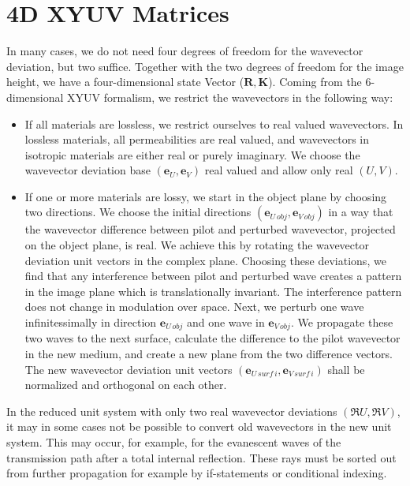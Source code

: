 \documentclass[12pt,a4paper,twoside,openright,BCOR10mm,headsepline,titlepage,abstracton,chapterprefix,final]{scrreprt}
\newcommand\Vector[1]{{\mathbf{#1}}}
\begin{document}
\section{4D XYUV Matrices}
In many cases, we do not need four degrees of freedom for the wavevector deviation, but two suffice.
Together with the two degrees of freedom for the image height, we have a four-dimensional state Vector ($\Vector{R}, \Vector{K}$).
Coming from the 6-dimensional XYUV formalism, we restrict the wavevectors in the following way:
\begin{itemize}
 \item If all materials are lossless, we restrict ourselves to real valued wavevectors.
       In lossless materials, all permeabilities are real valued, and wavevectors in isotropic materials are either real or purely imaginary.
       We choose the wavevector deviation base $( \Vector{e}_U, \Vector{e}_V)$ real valued and allow only real $(U,V)$.
 \item If one or more materials are lossy, we start in the object plane by choosing two directions.
       We choose the initial directions $( \Vector{e}_{U\,obj}, \Vector{e}_{V\,obj})$ in a way that the
       wavevector difference between pilot and perturbed wavevector, projected on the object plane, is real.
       We achieve this by rotating the wavevector deviation unit vectors in the complex plane.
       Choosing these deviations, we find that any interference between pilot and perturbed wave
       creates a pattern in the image plane which is translationally invariant.
       The interference pattern does not change in modulation over space.
       Next, we perturb one wave infinitessimally in direction $\Vector{e}_{U\,obj}$ and one wave in $\Vector{e}_{V\,obj}$.
       We propagate these two waves to the next surface, calculate the difference to the pilot wavevector in the new medium,
       and create a new plane from the two difference vectors.
       The new wavevector deviation unit vectors $( \Vector{e}_{U\,surf\,i}, \Vector{e}_{V\,surf\,i})$ shall be normalized and orthogonal on each other.
\end{itemize}
In the reduced unit system with only two real wavevector deviations $(\Re U, \Re V)$,
it may in some cases not be possible to convert old wavevectors in the new unit system.
This may occur, for example, for the evanescent waves of the transmission path after a total internal reflection.
These rays must be sorted out from further propagation for example by if-statements or conditional indexing.
\end{document}
